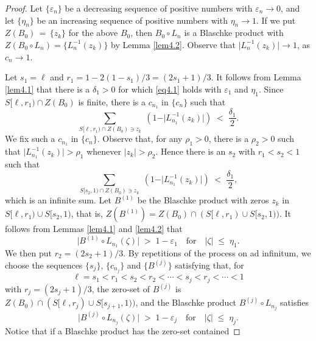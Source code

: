 \documentclass[12pt]{amsart}
\theoremstyle{plain}
\numberwithin{equation}{section}
\begin{document}
\begin{proof}
Let $\{\varepsilon_n\}$ be a decreasing sequence of positive numbers
with $\varepsilon_n \to 0$, and let $\{\eta_n\}$ be an increasing
sequence of positive numbers with $\eta_n \to 1$.
If we put $Z(B_0)\,=\,\{z_k\}$ for the above $B_0$,
then $B_0 \circ L_n$ is a Blaschke product with
$Z(B_0 \circ L_n) = \{L_n^{-1}(z_k)\}$ by Lemma \ref{lem4.2}.
Observe that $\vert L_n^{-1}(z_k)\vert \to 1$, as $c_n \to 1$.

Let $s_1=\ell$ and $r_1 = 1- 2(1-s_1)/3= (2s_1+1)/3$. It follows from
Lemma \ref{lem4.1} that there is a $\delta_1>0 $ for which \eqref{eq4.1}
holds with $\varepsilon_1$ and $\eta_1$.
Since $S[\ell,r_1)\cap Z(B_0)$ is finite, there is a $c_{n_1}$ in $\{c_n\}$
such that
\begin{equation*}
\sum_{S[\ell,r_1)\cap Z(B_0)\ni z_k}\;\left(1-
\vert L_{n_1}^{-1}(z_k)\vert \right)
\;<\; \frac{\delta_1}{2}.
\end{equation*}
We fix such a $c_{n_1}$ in $\{c_n\}$.
Observe that, for any $\rho_1 > 0$, there is a $\rho_2 > 0$
such that $\vert L_{n_1}^{-1}(z_k)\vert > \rho_1$ whenever
$\vert z_k \vert > \rho_2 $. Hence there is an $s_2$ with
$r_1<s_2<1$ such that
\begin{equation*}
\sum_{S[s_2,1)\cap Z(B_0)\ni z_k}\;
\left(1-\vert L_{n_1}^{-1}(z_k)\vert \right)
\;<\; \frac{\delta_1}{2},
\end{equation*}
which is an infinite sum. Let $B^{(1)}$ be the
Blaschke product with zeros $z_k$
in $S[\ell,r_1)\cup S[s_2,1)$, that is, $Z(B^{(1)}) = Z(B_0)\cap (S[\ell,r_1)\cup S[s_2,1))$.
It follows from Lemmas \ref{lem4.1} and \ref{lem4.2} that
$$
\vert B^{(1)}\circ L_{n_1}(\zeta)\vert\; >\; 1-\varepsilon_1
\quad \text{for}\quad \vert \zeta \vert \;\le \;\eta_1.
$$
We then put $r_2 = (2s_2+1)/3$. By repetitions of the process
on ad infinitum, we choose the sequences $\{s_j\}$, $\{c_{n_j}\}$
and $\{B^{(j)}\}$ satisfying that, for
\begin{equation*}
\ell = s_1<r_1<s_2<r_2<\cdots <s_j<r_j<\cdots <1
\end{equation*}
with $r_j=(2s_j+1)/3$, the zero-set of $B^{(j)}$ is
$Z(B_0)\cap (S[\ell,r_j)\cup S[s_{j+1},1))$, and the
Blaschke product $ B^{(j)}\circ L_{n_j}$
satisfies
\begin{equation}
\label{eq4.3}
\vert B^{(j)}\circ L_{n_j}(\zeta)\vert\; >\; 1-\varepsilon_j
\quad \text{for}\quad \vert \zeta \vert \;\le\; \eta_j.
\end{equation}
Notice that if a Blaschke product has the zero-set contained

\end{proof}
\end{document}
